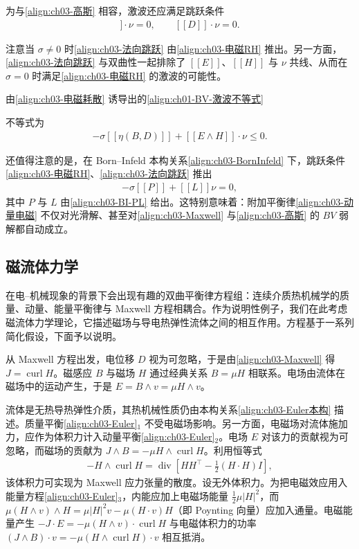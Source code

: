 ﻿\documentclass[../../main.tex]{subfiles}
\begin{document}
为与\eqref{align:ch03-高斯} 相容，激波还应满足跳跃条件
\begin{align}
[\![B]\!]\cdot\nu=0,\qquad [\![D]\!]\cdot\nu=0.
\label{align:ch03-法向跳跃}
\end{align}

注意当 $\sigma\neq0$ 时\eqref{align:ch03-法向跳跃} 由\eqref{align:ch03-电磁RH} 推出。另一方面，\eqref{align:ch03-法向跳跃} 与双曲性一起排除了 $[\![E]\!]$、$[\![H]\!]$ 与 $\nu$ 共线、从而在 $\sigma=0$ 时满足\eqref{align:ch03-电磁RH} 的激波的可能性。

由\eqref{align:ch03-电磁耗散} 诱导出的\eqref{align:ch01-BV-激波不等式}%

不等式为
\begin{align}
-\sigma[\![\eta(B,D)]\!]+[\![E\wedge H]\!]\cdot\nu\leqslant0.
\label{align:ch03-电磁熵不等式}
\end{align}

还值得注意的是，在 Born--Infeld 本构关系\eqref{align:ch03-BornInfeld} 下，跳跃条件\eqref{align:ch03-电磁RH}、\eqref{align:ch03-法向跳跃} 推出
\begin{align}
-\sigma[\![P]\!]+[\![L]\!]\nu=0,
\label{align:ch03-电磁动量跳跃}
\end{align}
其中 $P$ 与 $L$ 由\eqref{align:ch03-BI-PL} 给出。这特别意味着：附加平衡律\eqref{align:ch03-动量电磁} 不仅对光滑解、甚至对\eqref{align:ch03-Maxwell} 与\eqref{align:ch03-高斯} 的 $BV$ 弱解都自动成立。

\subsection{磁流体力学}\label{subsection:ch03-MHD}

在电--机械现象的背景下会出现有趣的双曲平衡律方程组：连续介质热机械学的质量、动量、能量平衡律与 Maxwell 方程相耦合。作为说明性例子，我们在此考虑磁流体力学理论，它描述磁场与导电热弹性流体之间的相互作用。方程基于一系列简化假设，下面予以说明。

从 Maxwell 方程出发，电位移 $D$ 视为可忽略，于是由\eqref{align:ch03-Maxwell} 得 $J=\operatorname{curl}H$。磁感应 $B$ 与磁场 $H$ 通过经典关系 $B=\mu H$ 相联系。电场由流体在磁场中的运动产生，于是 $E=B\wedge v=\mu H\wedge v$。

流体是无热导热弹性介质，其热机械性质仍由本构关系\eqref{align:ch03-Euler本构} 描述。质量平衡\eqref{align:ch03-Euler}$_{1}$ 不受电磁场影响。另一方面，电磁场对流体施加力，应作为体积力计入动量平衡\eqref{align:ch03-Euler}$_{2}$。电场 $E$ 对该力的贡献视为可忽略，而磁场的贡献为 $J\wedge B=-\mu H\wedge\operatorname{curl}H$。利用恒等式
\begin{align}
-H\wedge\operatorname{curl}H=\operatorname{div}\left[HH^{\top}-\frac{1}{2}(H\cdot H)I\right],
\label{align:ch03-Maxwell应力}
\end{align}
该体积力可实现为 Maxwell 应力张量的散度。设无外体积力。为把电磁效应用入能量方程\eqref{align:ch03-Euler}$_{3}$，内能应加上电磁场能量 $\frac{1}{2}\mu|H|^{2}$，而 $\mu(H\wedge v)\wedge H=\mu|H|^{2}v-\mu(H\cdot v)H$（即 Poynting 向量）应加入通量。电磁能量产生 $-J\cdot E=-\mu(H\wedge v)\cdot\operatorname{curl}H$ 与电磁体积力的功率 $(J\wedge B)\cdot v=-\mu(H\wedge\operatorname{curl}H)\cdot v$ 相互抵消。
\end{document}
